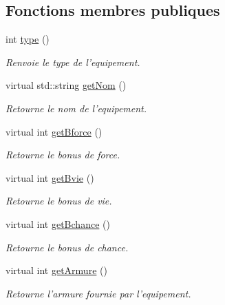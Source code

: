 \subsection*{Fonctions membres publiques}
\begin{DoxyCompactItemize}
\item 
int \hyperlink{class_casque_acb93c4c89d61c945d75ee3d47bede861}{type} ()
\begin{DoxyCompactList}\small\item\em Renvoie le type de l'equipement. \end{DoxyCompactList}\item 
virtual std\-::string \hyperlink{class_equipement_a0b0426a70bfce6e7c3efac605b75cd8e}{get\-Nom} ()
\begin{DoxyCompactList}\small\item\em Retourne le nom de l'equipement. \end{DoxyCompactList}\item 
virtual int \hyperlink{class_equipement_aabcf10fd762945fa4a37a9cf8321f463}{get\-Bforce} ()
\begin{DoxyCompactList}\small\item\em Retourne le bonus de force. \end{DoxyCompactList}\item 
virtual int \hyperlink{class_equipement_ad9fd7528c4f181970b7a0877f4145f89}{get\-Bvie} ()
\begin{DoxyCompactList}\small\item\em Retourne le bonus de vie. \end{DoxyCompactList}\item 
virtual int \hyperlink{class_equipement_a73485135eacdf30d5f49c9e34e5f4d0e}{get\-Bchance} ()
\begin{DoxyCompactList}\small\item\em Retourne le bonus de chance. \end{DoxyCompactList}\item 
virtual int \hyperlink{class_equipement_a8577d49fd00b8effa39388feccb29901}{get\-Armure} ()
\begin{DoxyCompactList}\small\item\em Retourne l'armure fournie par l'equipement. \end{DoxyCompactList}\end{DoxyCompactItemize}

